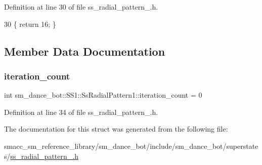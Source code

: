 Definition at line 30 of file ss\+\_\+radial\+\_\+pattern\+\_.\+h.


\begin{DoxyCode}
30 \{ \textcolor{keywordflow}{return} 16; \}
\end{DoxyCode}


\subsection{Member Data Documentation}
\mbox{\label{structsm__dance__bot_1_1SS1_1_1SsRadialPattern1_a148a819e2406f494f14afae15e1497b5}} 
\subsubsection{\texorpdfstring{iteration\+\_\+count}{iteration\_count}}
{\footnotesize\ttfamily int sm\+\_\+dance\+\_\+bot\+::\+S\+S1\+::\+Ss\+Radial\+Pattern1\+::iteration\+\_\+count = 0}



Definition at line 34 of file ss\+\_\+radial\+\_\+pattern\+\_.\+h.



The documentation for this struct was generated from the following file\+:\begin{DoxyCompactItemize}
\item 
smacc\+\_\+sm\+\_\+reference\+\_\+library/sm\+\_\+dance\+\_\+bot/include/sm\+\_\+dance\+\_\+bot/superstates/\hyperlink{include_2sm__dance__bot_2superstates_2ss__radial__pattern__1_8h}{ss\+\_\+radial\+\_\+pattern\+\_.\+h}\end{DoxyCompactItemize}
